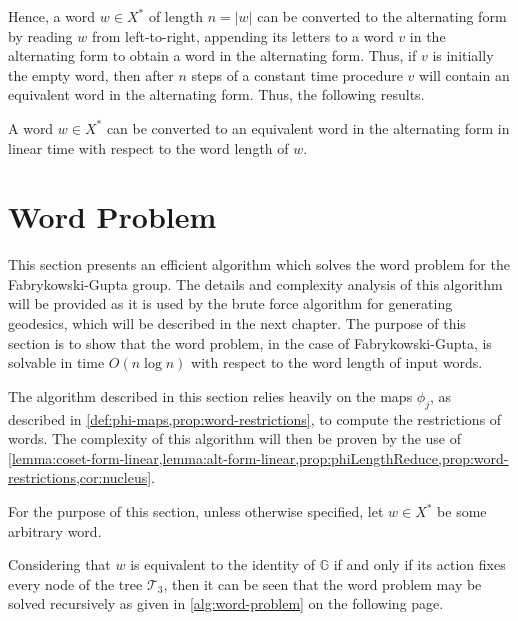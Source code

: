 Hence, a word $w\in X^\ast$ of length $n = \left\vert w \right\vert$ can be converted to the alternating form by reading $w$ from left-to-right, appending its letters to a word $v$ in the alternating form to obtain a word in the alternating form.
Thus, if $v$ is initially the empty word, then after $n$ steps of a constant time procedure $v$ will contain an equivalent word in the alternating form.
Thus, the following results.

\begin{lemma}
	\label{lemma:alt-form-linear}
	A word $w \in X^\ast$ can be converted to an equivalent word in the alternating form in linear time with respect to the word length of $w$.
\end{lemma}

\section{Word Problem}
\label{sec:word-problem}

This section presents an efficient algorithm which solves the word problem for the Fabrykowski-Gupta group.
The details and complexity analysis of this algorithm will be provided as it is used by the brute force algorithm for generating geodesics, which will be described in the next chapter.
The purpose of this section is to show that the word problem, in the case of Fabrykowski-Gupta, is solvable in time $O(n \log n)$ with respect to the word length of input words.

The algorithm described in this section relies heavily on the maps $\phi_j$, as described in \cref{def:phi-maps,prop:word-restrictions}, to compute the restrictions of words.
The complexity of this algorithm will then be proven by the use of \cref{lemma:coset-form-linear,lemma:alt-form-linear,prop:phiLengthReduce,prop:word-restrictions,cor:nucleus}.

For the purpose of this section, unless otherwise specified, let $w \in X^\ast$ be some arbitrary word.

Considering that $w$ is equivalent to the identity of $\mathbb{G}$ if and only if its action fixes every node of the tree $\mathcal{T}_3$, then it can be seen that the word problem may be solved recursively as given in \cref{alg:word-problem} on the following page.

